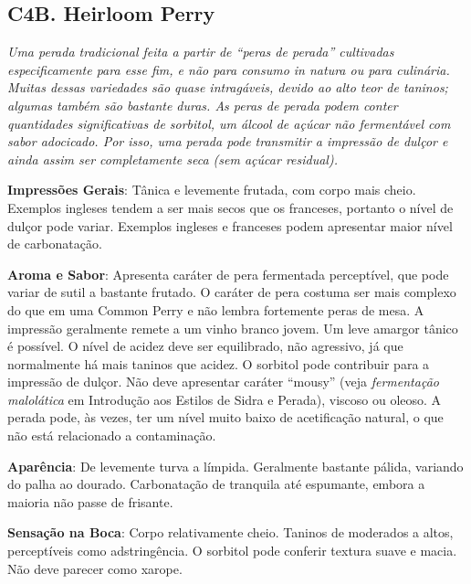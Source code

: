 \subsection*{C4B. Heirloom Perry}

\textit{Uma perada tradicional feita a partir de “peras de perada” cultivadas especificamente para esse fim, e não para consumo \textit{in natura} ou para culinária. Muitas dessas variedades são quase intragáveis, devido ao alto teor de taninos; algumas também são bastante duras. As peras de perada podem conter quantidades significativas de sorbitol, um álcool de açúcar não fermentável com sabor adocicado. Por isso, uma perada pode transmitir a impressão de dulçor e ainda assim ser completamente seca (sem açúcar residual).}

\textbf{Impressões Gerais}: Tânica e levemente frutada, com corpo mais cheio. Exemplos ingleses tendem a ser mais secos que os franceses, portanto o nível de dulçor pode variar. Exemplos ingleses e franceses podem apresentar maior nível de carbonatação.

\textbf{Aroma e Sabor}: Apresenta caráter de pera fermentada perceptível, que pode variar de sutil a bastante frutado. O caráter de pera costuma ser mais complexo do que em uma Common Perry e não lembra fortemente peras de mesa. A impressão geralmente remete a um vinho branco jovem. Um leve amargor tânico é possível. O nível de acidez deve ser equilibrado, não agressivo, já que normalmente há mais taninos que acidez. O sorbitol pode contribuir para a impressão de dulçor. Não deve apresentar caráter “mousy” (veja \textit{fermentação malolática} em Introdução aos Estilos de Sidra e Perada), viscoso ou oleoso. A perada pode, às vezes, ter um nível muito baixo de acetificação natural, o que não está relacionado a contaminação.

\textbf{Aparência}: De levemente turva a límpida. Geralmente bastante pálida, variando do palha ao dourado. Carbonatação de tranquila até espumante, embora a maioria não passe de frisante.

\textbf{Sensação na Boca}: Corpo relativamente cheio. Taninos de moderados a altos, perceptíveis como adstringência. O sorbitol pode conferir textura suave e macia. Não deve parecer como xarope.

